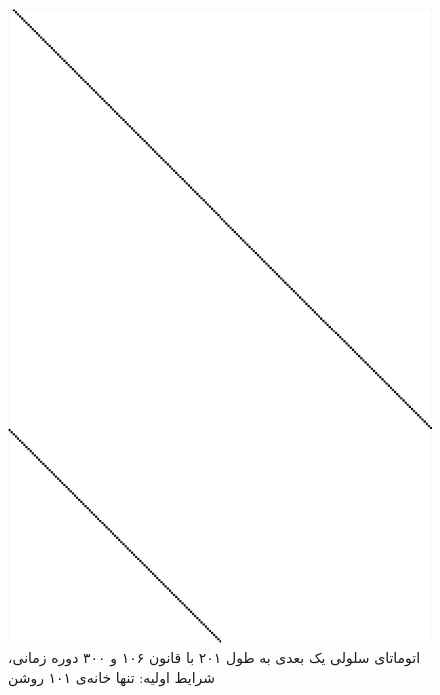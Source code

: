 \documentclass[11pt, a4paper]{article}
\begin{document}
\begin{figure}[!tbp]
  \begin{minipage}[b]{0.3\textwidth}
    \includegraphics[width=\textwidth]{q3-106}
    \caption{اتوماتای سلولی یک بعدی به طول ۲۰۱ با قانون ۱۰۶ و ۳۰۰ دوره زمانی، شرایط اولیه: تنها خانه‌ی ۱۰۱ روشن}
    \label{fig:q3-106}
  \end{minipage}
  \hfill
  \begin{minipage}[b]{0.3\textwidth}

\end{minipage}
\end{figure}
\end{document}

